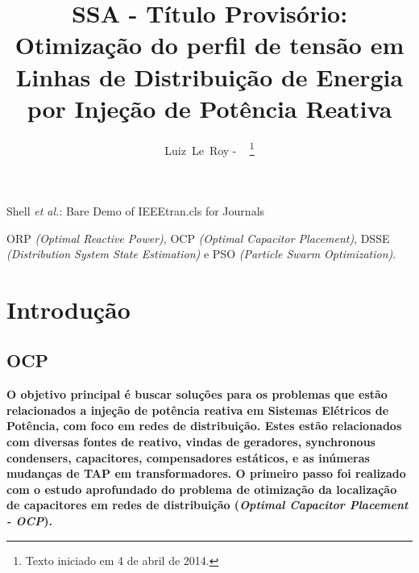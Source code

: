 \documentclass{IEEEtran}
\begin{document}
\title{SSA - Título Provisório:\\Otimização do perfil de tensão em Linhas de Distribuição de Energia por Injeção de Potência Reativa}


\author{Luiz~Le~Roy - ~
\thanks{Texto iniciado em 4 de abril de 2014.}}

%
{Shell \MakeLowercase{\textit{et al.}}: Bare Demo of IEEEtran.cls for Journals}

\maketitle



\begin{IEEEkeywords}
ORP \textit{(Optimal Reactive Power)}, OCP \textit{(Optimal Capacitor Placement)}, DSSE \textit{(Distribution System State Estimation)} e PSO \textit{(Particle Swarm Optimization)}.
\end{IEEEkeywords}

\IEEEpeerreviewmaketitle
\section{Introdução}
\subsection{OCP}
\textbf{O objetivo principal é buscar soluções para os problemas que estão relacionados a injeção de potência reativa em Sistemas Elétricos de Potência, com foco em redes de distribuição. Estes estão relacionados com diversas fontes de reativo, vindas de geradores, synchronous condensers, capacitores, compensadores estáticos, e as inúmeras mudanças de TAP em transformadores. O primeiro passo foi realizado com o estudo aprofundado do problema de otimização da localização de capacitores em redes de distribuição (\textit{Optimal Capacitor Placement - OCP}). }
\end{document}
